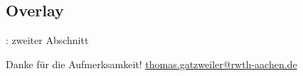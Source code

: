 \documentclass[xcolor=table,presentation]{beamer}    %
\makeatletter
\renewcommand*{\email}{\url{thomas.gatzweiler@rwth-aachen.de}}
\makeatother
\begin{document}
\subsection{Overlay}
\begin{frame}{\insertsection: \insertsubsection}
 zweiter Abschnitt
\end{frame}




\begin{frame}[label=finalSlide]
  \label{LastPage}%
  \begin{center}
    \vfill
    {\Large
    \textcolor{i6blue}{Danke für die Aufmerksamkeit!}
    }
    \vfill
    {\Large \insertauthor}
    \vfill
    \email{}
  \end{center}
\end{frame}
\end{document}
